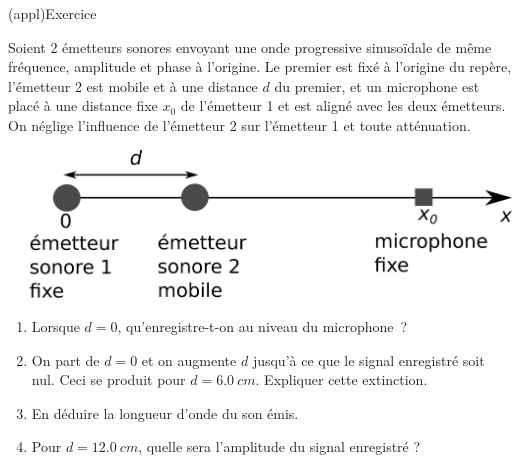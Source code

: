 \documentclass[../../main/main.tex]{subfiles}
\begin{document}
\begin{tcb}[breakable](appl){Exercice}
	\begin{minipage}{0.55\linewidth}
		Soient 2 émetteurs sonores envoyant une onde progressive sinusoïdale de
		même fréquence, amplitude et phase à l'origine. Le premier est fixé à
		l'origine du repère, l'émetteur 2 est mobile et à une distance $d$ du
		premier, et un microphone est placé à une distance fixe $x_0$ de
		l'émetteur 1 et est aligné avec les deux émetteurs. On néglige
		l'influence de l'émetteur 2 sur l'émetteur 1 et toute atténuation.
	\end{minipage}
	\hfill
	\begin{minipage}{0.45\linewidth}
		\begin{center}
			\includegraphics[width=\linewidth]{microphone}
		\end{center}
	\end{minipage}
	\begin{enumerate}[label=\sqenumi]
		\item Lorsque $d=0$, qu'enregistre-t-on au niveau du microphone~?
		\item On part de $d=0$ et on augmente $d$ jusqu'à ce que le signal
		      enregistré soit nul. Ceci se produit pour $d = \SI{6.0}{cm}$.
		      Expliquer cette extinction.
		\item En déduire la longueur d'onde du son émis.
		\item Pour $d = \SI{12.0}{cm}$, quelle sera l'amplitude du signal
		      enregistré ?
	\end{enumerate}
	\tcblower
\end{tcb}
\end{document}
